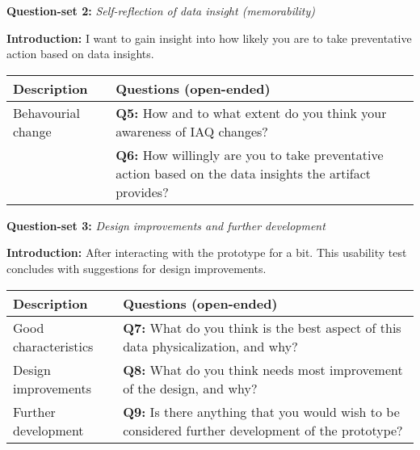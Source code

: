 \begin{appendices}
\vspace{-10pt}

\begin{table}[htbp]
    \captionsetup{justification=raggedright,singlelinecheck=false}
    \raggedright \textbf{Question-set 2:} \textit{Self-reflection of data insight (memorability)} \\
    \raggedright \textbf{Introduction:} I want to gain insight into how likely you are to take preventative action based on data insights.
    \label{tab:column_widths}
    \begin{tabularx}{\textwidth}{|p{}|X|}
        \hline
        \textbf{Description} & \textbf{Questions (open-ended)} \\
        \hline
        Behavourial change & 
        \textbf{Q5:} How and to what extent do you think your awareness of IAQ changes? \\
        & \textbf{Q6:} How willingly are you to take preventative action based on the data insights the artifact provides? \\
        \hline
    \end{tabularx}
\end{table}

\vspace{-10pt}


\begin{table}[htbp]
    \captionsetup{justification=raggedright,singlelinecheck=false}
    \raggedright \textbf{Question-set 3:} \textit{Design improvements and further development} \\
    \raggedright \textbf{Introduction:} After interacting with the prototype for a bit. This usability test concludes with suggestions for design improvements.
    \label{tab:column_widths}
    \begin{tabularx}{\textwidth}{|p{}|X|}
        \hline
        \textbf{Description} & \textbf{Questions (open-ended)} \\
        \hline
        Good characteristics & \textbf{Q7:} What do you think is the best aspect of this data physicalization, and why? \\
        \hline
        Design improvements & \textbf{Q8:} What do you think needs most improvement of the design, and why? \\
        \hline
        Further development & \textbf{Q9:} Is there anything that you would wish to be considered further development of the prototype? \\
        \hline
    \end{tabularx}
\end{table}


\end{appendices}
